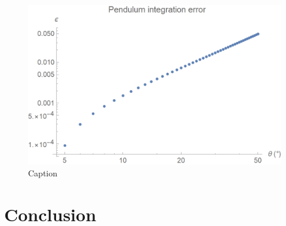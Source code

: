 \documentclass{article}
\begin{document}
\begin{figure}[h]
    \centering
    \includegraphics[width=5in]{homework2/pendulum.png}
    \caption{Caption}
    \label{fig:pendulum}
\end{figure}

\section{Conclusion}
\end{document}

